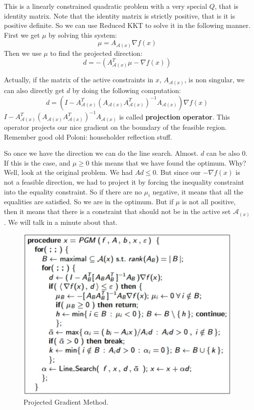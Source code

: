 This is a linearly constrained quadratic problem with a very special $Q$, that is identity matrix. Note that the identity matrix is strictly positive, that is it is positive definite. So we can use Reduced KKT to solve it in the following manner. First we get $\mu$ by solving this system:
\begin{equation}
    [A_{\mathcal{A}(x)}A_{\mathcal{A}(x)}^T]\mu = A_{\mathcal{A}(x)}\nabla f(x)
\end{equation}
Then we use $\mu$ to find the projected direction:
\begin{equation}
    d = -(A_{\mathcal{A}(x)}^T\mu - \nabla f(x))
\end{equation}
\par Actually, if the matrix of the active constraints in $x$, $A_{\mathcal{A}(x)}$, is non singular, we can also directly get $d$ by doing the following computation:
\begin{equation}
    d = (I - A_{\mathcal{A}(x)}^T(A_{\mathcal{A}(x)}A_{\mathcal{A}(x)}^T)^{-1}A_{\mathcal{A}(x)})\nabla f(x)
\end{equation}
$I - A_{\mathcal{A}(x)}^T(A_{\mathcal{A}(x)}A_{\mathcal{A}(x)}^T)^{-1}A_{\mathcal{A}(x)}$ is called \textbf{projection operator}. This operator projects our nice gradient on the boundary of the feasible region. Remember good old Poloni: householder reflection stuff.
\par So once we have the direction we can do the line search. Almost. $d$ can be also 0. If this is the case, and $\mu \geq 0$ this means that we have found the optimum. Why? Well, look at the original problem. We had $A d \leq 0$. But since our $-\nabla f(x)$ is not a feasible direction, we had to project it by forcing the inequality constraint into the equality constraint. So if there are no $\mu_i$ negative, it means that all the equalities are satisfied. So we are in the optimum. But if $\mu$ is not all positive, then it means that there is a constraint that should not be in the active set $\mathcal{A}_(x)$. We will talk in a minute about that.
\begin{figure}
    \centering
    \includegraphics[scale=0.5]{figures/3/chapter3-pgm.png}
    \caption{Projected Gradient Method.}
    \label{fig:chapter3-pgm}
\end{figure}
